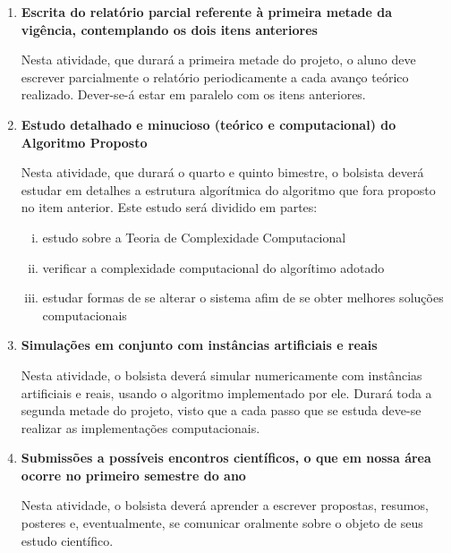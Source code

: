 \documentclass[11pt]{article}
\begin{document}
{{\begin{enumerate}[(1)]
\begin{enumerate}[(i)]
	\end{enumerate}
	
	 Todas as contas devem ser abertas e teoremas demonstrados. Este item e o anterior estão ligados e durarão o mesmo tempo porque devem ser estudados em paralelo, já que são os temas principais e co-relacionados fortemente.
	
	\item {\bf Escrita do relatório parcial referente à primeira metade da vigência, contemplando os dois itens anteriores}
	
	Nesta atividade, que durará a primeira metade do projeto, o aluno deve escrever parcialmente o relatório periodicamente a cada avanço teórico realizado. Dever-se-á estar em paralelo com os itens anteriores.
	
	\item {\bf Estudo detalhado e minucioso (teórico e computacional) do Algoritmo Proposto}
	
	Nesta atividade, que durará o quarto e quinto bimestre, o bolsista deverá estudar em detalhes a estrutura algorítmica do algoritmo que fora proposto no item anterior. Este estudo será dividido em partes:
	
	\begin{enumerate}[(i)]
		\item estudo sobre a Teoria de Complexidade Computacional
		
		\item verificar a complexidade computacional do algorítimo adotado
		
		\item estudar formas de se alterar o sistema afim de se obter melhores soluções computacionais
	\end{enumerate}
	
	\item {\bf Simulações em conjunto com instâncias artificiais e reais}
	
	Nesta atividade, o bolsista deverá simular numericamente com instâncias artificiais e reais, usando o algoritmo implementado por ele. Durará toda a segunda metade do projeto, visto que a cada passo que se estuda deve-se realizar as implementações computacionais.
	
	\item {\bf Submissões a possíveis encontros científicos, o que em nossa área ocorre no primeiro semestre do ano}
	
	Nesta atividade, o bolsista deverá aprender a escrever propostas, resumos, posteres e, eventualmente, se comunicar oralmente sobre o objeto de seus estudo científico.
	

\end{enumerate}}}
\end{document}
